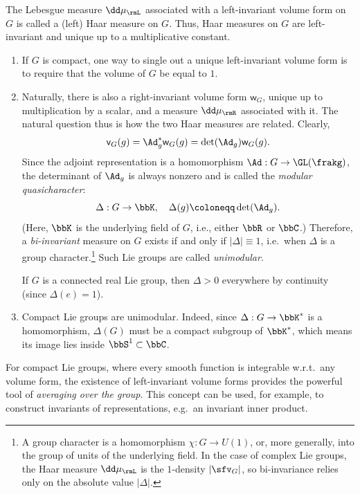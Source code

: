 \begin{defn}
    The Lebesgue measure $\dd\mu_\rmL$ associated with a left-invariant volume form on $G$ is called a (left) Haar measure on $G$. Thus, Haar measures on $G$ are left-invariant and unique up to a multiplicative constant.
\end{defn}

\begin{rem}\label{rem biinvariant measures}
    \begin{enumerate}
        \item If $G$ is compact, one way to single out a unique left-invariant volume form is to require that the volume of $G$ be equal to $1$.
        \item Naturally, there is also a right-invariant volume form $\mathsf{w}_G$, unique up to multiplication by a scalar, and a measure $\dd\mu_\rmR$ associated with it. The natural question thus is how the two Haar measures are related. Clearly,
        \[\mathsf{v}_G(g)=\Ad_g^\ast \mathsf{w}_G(g)=\det(\Ad_g)\mathsf{w}_G(g).\]
        Since the adjoint representation is a homomorphism $\Ad:G\to\GL(\frakg)$, the determinant of $\Ad_g$ is always nonzero and is called the \emph{modular quasicharacter}:
        \[\Delta: G\to \bbK,\quad \Delta(g)\coloneqq\det(\Ad_g).\]
        (Here, $\bbK$ is the underlying field of $G$, i.e., either $\bbR$ or $\bbC$.)
        Therefore, a \emph{bi-invariant} measure on $G$ exists if and only if $|\Delta|\equiv 1$, i.e.~when $\Delta$ is a group character.\footnote{A group character is a homomorphism $\chi:G\to U(1)$, or, more generally, into the group of units of the underlying field. In the case of complex Lie groups, the Haar measure $\dd \mu_\rmL$ is the $1$-density $|\sfv_G|$, so bi-invariance relies only on the absolute value $|\Delta|$.} Such Lie groups are called \emph{unimodular}.
        
        If $G$ is a connected real Lie group, then $\Delta>0$ everywhere by continuity (since $\Delta(e)=1$). 
        \item Compact Lie groups are unimodular. Indeed, since $\Delta:G\to \bbK^\ast$ is a homomorphism, $\Delta(G)$ must be a compact subgroup of $\bbK^\ast$, which means its image lies inside $\bbS^1\subset\bbC$.
    \end{enumerate}
\end{rem}



For compact Lie groups, where every smooth function is integrable w.r.t.\ any volume form, the existence of left-invariant volume forms provides the powerful tool of \emph{averaging over the group}. This concept can be used, for example, to construct invariants of representations, e.g.~an invariant inner product.

